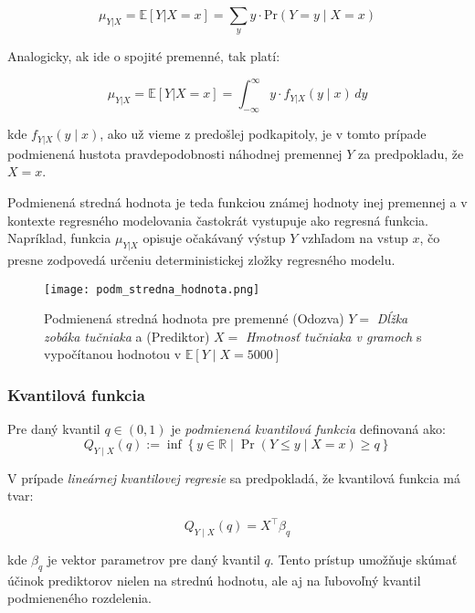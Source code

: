\begin{equation}
\mu_{Y|X} = \mathbb{E}[Y|X = x] = \sum_{y} y \cdot \mathrm{Pr}(Y = y \mid X = x)
\end{equation}

Analogicky, ak ide o spojité premenné, tak platí:

\begin{equation}
\mu_{Y|X} = \mathbb{E}[Y|X = x] = \int_{-\infty}^{\infty} y \cdot f_{Y|X}(y \mid x) \, dy
\end{equation}

kde $f_{Y|X}(y \mid x)$, ako už vieme z predošlej podkapitoly, je v tomto prípade podmienená hustota pravdepodobnosti náhodnej premennej $Y$ za predpokladu, že $X = x$.

Podmienená stredná hodnota je teda funkciou známej hodnoty inej premennej a v kontexte regresného modelovania častokrát vystupuje ako regresná funkcia. Napríklad, funkcia $\mu_{Y|X}$ opisuje očakávaný výstup $Y$ vzhľadom na vstup $x$, čo presne zodpovedá určeniu deterministickej zložky regresného modelu.

\begin{figure}[H]
    \centering
    \texttt{[image: podm\_stredna\_hodnota.png]}
    \caption{Podmienená stredná hodnota pre premenné (Odozva) $Y=$ \textit{Dĺžka zobáka tučniaka} a (Prediktor) $X=$ \textit{Hmotnosť tučniaka v gramoch} s vypočítanou hodnotou v $\mathbb{E}[Y \mid X=5000]$}
    \label{fig:cond_mean}
\end{figure}

\subsubsection{Kvantilová funkcia}
\label{subsubsec:conditional_quantile_function}

Pre daný kvantil $q \in (0,1)$ je \textit{podmienená kvantilová funkcia} definovaná ako:
\begin{equation}
Q_{Y \mid X}(q) := \inf \left\{ y \in \mathbb{R} \mid \Pr(Y \leq y \mid X = x) \geq q \right\}
\end{equation}

V prípade \textit{lineárnej kvantilovej regresie} sa predpokladá, že kvantilová funkcia má tvar:

\begin{equation}
Q_{Y \mid X}(q) = X^\top \beta_q
\end{equation}

kde $\beta_q$ je vektor parametrov pre daný kvantil $q$. Tento prístup umožňuje skúmať účinok prediktorov nielen na strednú hodnotu, ale aj na ľubovoľný kvantil podmieneného rozdelenia.

